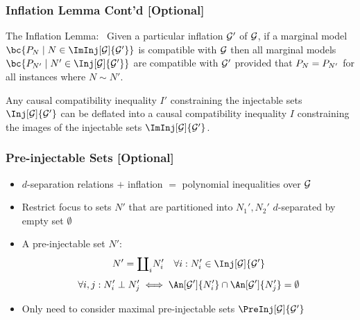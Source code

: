 \documentclass[
    hyperref={bookmarks=false},%
    xcolor={dvipsnames},
]{beamer}
\renewcommand{\term}[1]{\textcolor{Mahogany}{#1}}
\begin{document}
\begin{frame}
    \frametitle{Inflation Lemma Cont'd [Optional]}
    \begin{lemma}
        \term{The Inflation Lemma:}~\cite[lemma 3]{Inflation} Given a particular inflation $\mathcal{G}'$ of $\mathcal{G}$, if a marginal model $\bc{\prob[N] \mid N \in \ImInj[\graph]{\graph'}}$ is compatible with $\mathcal{G}$ then all marginal models $\bc{\prob[N'] \mid N' \in \Inj[\graph]{\graph'}}$ are compatible with $\mathcal{G}'$ provided that $\prob[N] = \prob[N']$ for all instances where $N \sim N'$.
    \end{lemma}
    \begin{corollary}
        Any causal compatibility inequality $I'$ constraining the injectable sets $\Inj[\graph]{\graph'}$ can be \term{deflated} into a causal compatibility inequality $I$ constraining the images of the injectable sets $\ImInj[\graph]{\graph'}$.
    \end{corollary}
\end{frame}

\begin{frame}
    \frametitle{Pre-injectable Sets [Optional]}
    \begin{itemize}
        \item $d$-separation relations $+$ inflation $=$ polynomial inequalities over $\mathcal{G}$
        \item Restrict focus to sets $N'$ that are partitioned into $N_1', N_2'$ $d$-separated by empty set $\emptyset$
        \item A \term{pre-injectable set} $N'$:
        \[ N' = {\coprod}_i N_i' \quad \forall i: N_i' \in \Inj[\graph]{\graph'} \]
        \[ \forall i, j : N_i' \ancestralindep N_j' \iff \An[\graph']{N'_i} \cap \An[\graph']{N'_j} = \emptyset \]
        \item Only need to consider \term{maximal pre-injectable sets} $\PreInj[\graph]{\graph'}$
    \end{itemize}
\end{frame}
\end{document}
